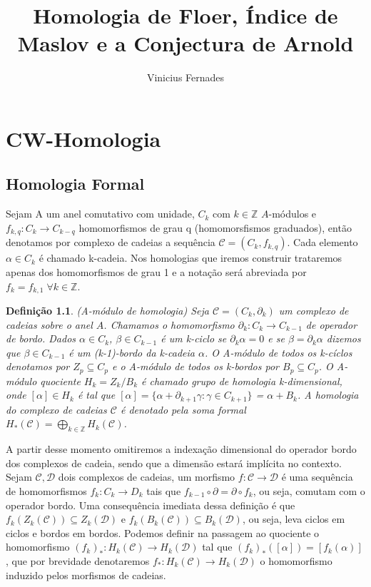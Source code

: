 \documentclass[12pt]{book}
\newtheorem{definicao}[teorema]{Definição}
\newcommand{\inteiros}{\mathbb{Z}}
\begin{document}
	
	\title{Homologia de Floer, Índice de Maslov e a Conjectura de Arnold}
	
	\author{Vinicius Fernades}
	
	\maketitle
	
	\tableofcontents
	
	\chapter{CW-Homologia}
	\section{Homologia Formal}
	Sejam A um anel comutativo com unidade, $C_{k}$ com $k \in \inteiros$ $A$-módulos e $f_{k,q}: C_{k} \to C_{k-q} $ homomorfismos de grau q (homomorsfismos graduados), então denotamos por complexo de cadeias a sequência $\mathcal{C} = (C_{k}, f_{k,q})$. Cada elemento $\alpha \in C_{k}$ é chamado k-cadeia. Nos homologias que iremos construir trataremos apenas dos homomorfismos de grau 1 e a notação será abreviada por $f_{k} = f_{k,1} \; \forall k \in \inteiros$.
	
	\begin{definicao}
		(A-módulo de homologia) Seja $\mathcal{C} = (C_{k}, \partial_{k})$ um complexo de cadeias sobre o anel $A$. Chamamos o homomorfismo $\partial_{k}: C_{k} \to C_{k-1} $ de operador de bordo. Dados $\alpha \in C_{k}$, $\beta \in C_{k-1}$  é um k-ciclo se $\partial_{k }\alpha=0$ e se $\beta =  \partial_{k }\alpha$ dizemos que $\beta \in C_{k-1}$ é um (k-1)-bordo da k-cadeia $\alpha$. O A-módulo de todos os k-cíclos denotamos por $Z_{p} \subseteq C_{p}$ e o  A-módulo de todos os k-bordos por $B_{p} \subseteq C_{p}$. O A-módulo quociente $H_{k} = Z_{k} / B_{k}$ é chamado grupo de homologia k-dimensional, onde $[\alpha] \in H_{k}$ é tal que $[\alpha] = \{\alpha+\partial_{k+1}\gamma :\gamma \in  C_{k+1}\}$ = $\alpha + B_{k}$. A homologia do complexo de cadeias $\mathcal{C}$ é denotado pela soma formal $H_{*}(\mathcal{C}) = \bigoplus_{k \in \inteiros} H_{k}(\mathcal{C})$.
	\end{definicao}
	
	A partir desse momento omitiremos a indexação dimensional do operador bordo dos complexos de cadeia, sendo que a dimensão estará implícita no contexto. Sejam $\mathcal{C}, \mathcal{D}$ dois complexos de cadeias, um morfismo $f: \mathcal{C} \to \mathcal{D}$ é uma sequência de homomorfismos $f_{k}: C_{k} \to D_{k}$ tais que $f_{k-1}\circ\partial = \partial\circ f_{k}$, ou seja, comutam com o operador bordo. Uma consequência imediata dessa definição é que $f_{k}(Z_{k}(\mathcal{C})) \subseteq Z_{k}(\mathcal{D})$ e $f_{k}(B_{k}(\mathcal{C})) \subseteq B_{k}(\mathcal{D})$, ou seja, leva ciclos em ciclos e bordos em bordos. Podemos definir na passagem ao quociente o homomorfismo $(f_{k})_{*}:H_{k}(\mathcal{C}) \to H_{k}(\mathcal{D})$ tal que $(f_{k})_{*}([\alpha]) = [f_{k}(\alpha)]$, que por brevidade denotaremos $f_{*}:H_{k}(\mathcal{C}) \to H_{k}(\mathcal{D})$ o homomorfismo induzido pelos morfismos de cadeias.
	
\end{document}
